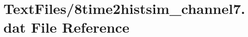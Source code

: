 \hypertarget{8time2histsim__channel7_8dat}{}\section{Text\+Files/8time2histsim\+\_\+channel7.dat File Reference}
\label{8time2histsim__channel7_8dat}
